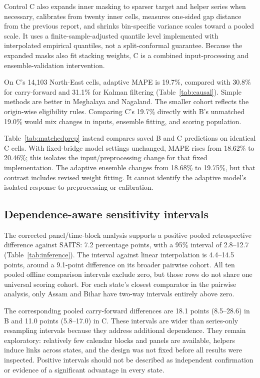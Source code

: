 \documentclass[sigconf,nonacm,balance=false]{acmart}
\begin{document}
Control C also expands inner masking to sparser target and helper series when necessary, calibrates from twenty inner cells, measures one-sided gap distance from the previous report, and shrinks bin-specific variance scales toward a pooled scale. It uses a finite-sample-adjusted quantile level implemented with interpolated empirical quantiles, not a split-conformal guarantee. Because the expanded masks also fit stacking weights, C is a combined input-processing and ensemble-validation intervention.

On C's 14,103 North-East cells, adaptive MAPE is 19.7\%, compared with 30.8\% for carry-forward and 31.1\% for Kalman filtering (Table~\ref{tab:causal}). Simple methods are better in Meghalaya and Nagaland. The smaller cohort reflects the origin-wise eligibility rules. Comparing C's 19.7\% directly with B's unmatched 19.0\% would mix changes in inputs, ensemble fitting, and scoring population.

Table~\ref{tab:matchedprep} instead compares saved B and C predictions on identical C cells. With fixed-bridge model settings unchanged, MAPE rises from 18.62\% to 20.46\%; this isolates the input/preprocessing change for that fixed implementation. The adaptive ensemble changes from 18.68\% to 19.75\%, but that contrast includes revised weight fitting. It cannot identify the adaptive model's isolated response to preprocessing or calibration.




\subsection{Dependence-aware sensitivity intervals}\label{sec:inference}

The corrected panel/time-block analysis supports a positive pooled retrospective difference against SAITS: 7.2 percentage points, with a 95\% interval of 2.8--12.7 (Table~\ref{tab:inference}). The interval against linear interpolation is 4.4--14.5 points, around a 9.1-point difference on its broader pairwise cohort. All ten pooled offline comparison intervals exclude zero, but those rows do not share one universal scoring cohort. For each state's closest comparator in the pairwise analysis, only Assam and Bihar have two-way intervals entirely above zero.

The corresponding pooled carry-forward differences are 18.1 points (8.5--28.6) in B and 11.0 points (5.8--17.0) in C. These intervals are wider than series-only resampling intervals because they address additional dependence. They remain exploratory: relatively few calendar blocks and panels are available, helpers induce links across states, and the design was not fixed before all results were inspected. Positive intervals should not be described as independent confirmation or evidence of a significant advantage in every state.
\end{document}
